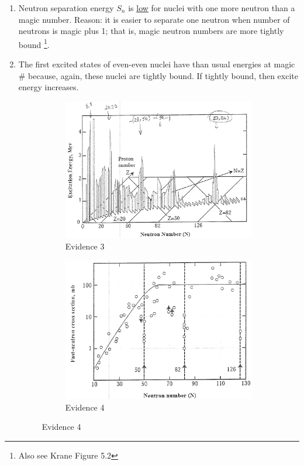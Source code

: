\documentclass{school-22.101-notes}
\begin{document}
\begin{enumerate}
\begin{enumerate}
\item Neutron separation energy $S_n$ is \uline{low} for nuclei with one more neutron than a magic number. Reason: it is easier to separate one neutron when number of neutrons is magic plus 1; that is, magic neutron numbers are more tightly bound \footnote{Also see Krane Figure 5.2}.
 
\item The first excited states of even-even nuclei have  than usual energies at magic \# because, again, these nuclei are tightly bound. If tightly bound, then excite energy increases. 
\begin{figure}[ht]
  \centering
  \begin{subfigure}[b]{0.45\textwidth}
    \centering
    \includegraphics[width=\textwidth]{images/shell/shell-evidence-3.png}
    \caption{Evidence 3}
    \label{fig:111}
  \end{subfigure}
  \begin{subfigure}[b]{0.45\textwidth}
    \centering
    \includegraphics[width=\textwidth]{images/shell/shell-evidence-4.png}
    \caption{Evidence 4}
    \label{fig:111}
  \end{subfigure}
\end{figure}


\end{enumerate}
\end{enumerate}
\end{document}
